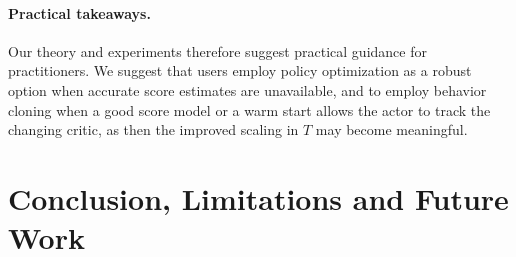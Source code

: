 \paragraph{Practical takeaways.} Our theory and experiments therefore suggest practical guidance for practitioners. We suggest that users employ policy optimization as a robust option when accurate score estimates are unavailable, and to employ behavior cloning when a good score model or a warm start allows the actor to track the changing critic, as then the improved scaling in $T$ may become meaningful.


\section{Conclusion, Limitations and Future Work}




